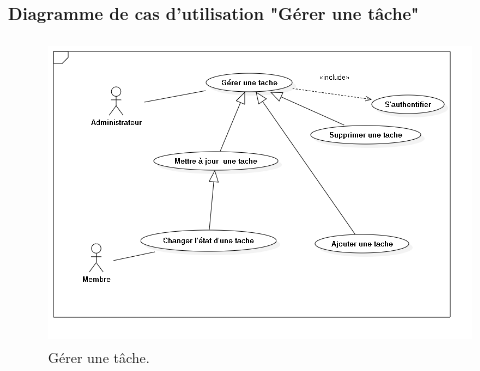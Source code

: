 \subsubsection{ Diagramme de cas d'utilisation "G\'{e}rer une t\^{a}che"}
\begin{figure}[H]
\center
\includegraphics[width=13cm,height=8cm]{./figures/ucT.png}
\caption{G\'{e}rer une t\^{a}che.}

\end{figure}




